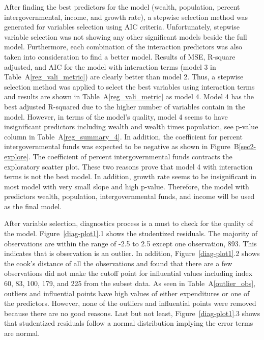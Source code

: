 \documentclass[11pt]{article}\usepackage[]{graphicx}\usepackage[]{color}
\begin{document}
\noindent After finding the best predictors for the model (wealth, population, percent intergovernmental, income, and growth rate), a stepwise selection method was generated for variables selection using AIC criteria. Unfortunately, stepwise variable selection was not showing any other significant models beside the full model. Furthermore, each combination of the interaction predictors was also taken into consideration to find a better model. Results of MSE, R-square adjusted, and AIC for the model with interaction terms (model 3 in Table~A\ref{reg_vali_metric}) are clearly better than model 2. Thus, a stepwise selection method was applied to select the best variables using interaction terms and results are shown in Table~A\ref{reg_vali_metric} as model 4. Model 4 has the best adjusted R-squared due to the higher number of variables contain in the model. However, in terms of the model's quality, model 4 seems to have insignificant predictors including wealth and wealth times population, see p-value column in Table~A\ref{reg_summary_4}. In addition, the coefficient for percent intergovernmental funds was expected to be negative as shown in Figure~B\ref{sec2-explore}. The coefficient of percent intergovernmental funds contracts the exploratory scatter plot. These two reasons prove that model 4 with interaction terms is not the best model. In addition, growth rate seems to be insignificant in most model with very small slope and high p-value. Therefore, the model with predictors wealth, population, intergovernmental funds, and income will be used as the final model.
\hfill \break

\noindent After variable selection, diagnostics process is a must to check for the quality of the model. Figure~\ref{diag-plot1}.1 shows the studentized residuals. The majority of observations are within the range of -2.5 to 2.5 except one observation, 893. This indicates that is observation is an outlier. In addition, Figure~\ref{diag-plot1}.2 shows the cook's distance of all the observations and found that there are a few observations did not make the cutoff point for influential values including index 60, 83, 100, 179, and 225 from the subset data. As seen in Table~A\ref{outlier_obs}, outliers and influential points have high values of either expenditures or one of the predictors. However, none of the outliers and influential points were removed because there are no good reasons. Last but not least, Figure~\ref{diag-plot1}.3 shows that studentized residuals follow a normal distribution implying the error terms are normal.    
\hfill \break
\end{document}
